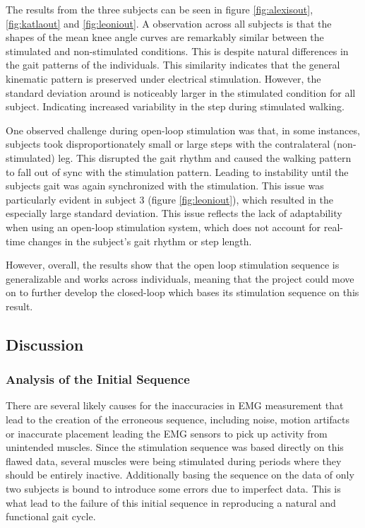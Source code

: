 The results from the three subjects can be seen in figure \ref{fig:alexisout}, \ref{fig:katlaout} and \ref{fig:leoniout}. A observation across all subjects is that the shapes of the mean knee angle curves are remarkably similar between the stimulated and non-stimulated conditions. This is despite natural differences in the gait patterns of the individuals. This similarity indicates that the general kinematic pattern is preserved under electrical stimulation. However, the standard deviation around is noticeably larger in the stimulated condition for all subject. Indicating increased variability in the step during stimulated walking.

One observed challenge during open-loop stimulation was that, in some instances, subjects took disproportionately small or large steps with the contralateral (non-stimulated) leg. This disrupted the gait rhythm and caused the walking pattern to fall out of sync with the stimulation pattern. Leading to instability until the subjects gait was again synchronized with the stimulation. This issue was particularly evident in subject 3 (figure \ref{fig:leoniout}), which resulted in the especially large standard deviation. This issue reflects the lack of adaptability when using an open-loop stimulation system, which does not account for real-time changes in the subject's gait rhythm or step length. 

However, overall, the results show that the open loop stimulation sequence is generalizable and works across individuals, meaning that the project could move on to further develop the closed-loop which bases its stimulation sequence on this result.

\subsection{Discussion}
\subsubsection{Analysis of the Initial Sequence}
There are several likely causes for the inaccuracies in EMG measurement that lead to the creation of the erroneous sequence, including noise, motion artifacts or inaccurate placement leading the EMG sensors to pick up activity from unintended muscles. Since the stimulation sequence was based directly on this flawed data, several muscles were being stimulated during periods where they should be entirely inactive. Additionally basing the sequence on the data of only two subjects is bound to introduce some errors due to imperfect data. This is what lead to the failure of this initial sequence in reproducing a natural and functional gait cycle. 

